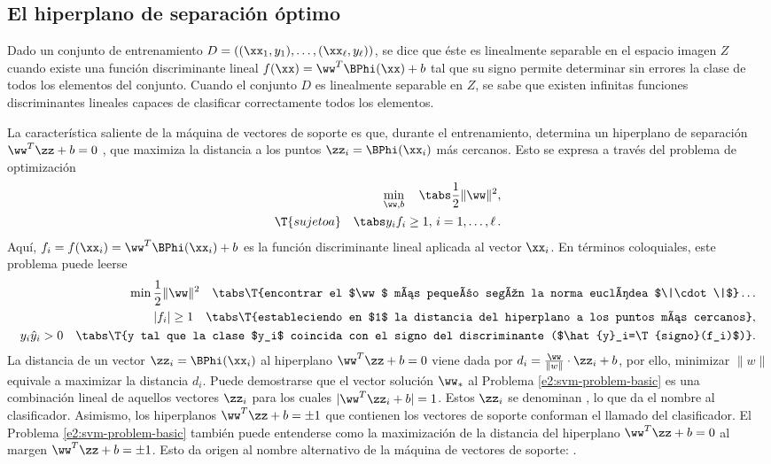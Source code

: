 %
%
\subsection{El hiperplano de separación óptimo}
%
Dado un conjunto de entrenamiento
$D=\left((\xx_1,y_1),\ldots,(\xx_\ell,y_\ell)\right)$, se dice que
éste es linealmente separable en el espacio imagen $Z$ cuando existe
una función discriminante lineal $f(\xx)=\ww^T\BPhi(\xx)+b$ tal que su
signo permite determinar sin errores la clase de todos los elementos
del conjunto. Cuando el conjunto $D$ es linealmente separable en $Z$,
se sabe que existen infinitas funciones discriminantes lineales
capaces de clasificar correctamente todos los elementos.

La característica saliente de la máquina de vectores de soporte es
que, durante el entrenamiento, determina un hiperplano de separación
$\ww^T\zz+b=0$ , que maximiza la distancia a los puntos
$\zz_i=\BPhi(\xx_i)$ más cercanos. Esto se expresa a través del
problema de optimización
%
\begin{equation}
  \begin{aligned}
    \min_{\ww,b} \quad\tabs \frac{1}{2}\|\ww\|^2, \\
    \T{sujeto a}\quad\tabs y_i f_i\geq1,\,i=1,\ldots,\ell\,.
  \end{aligned}
  \label{e2:svm-problem-basic}
\end{equation}
%
Aquí, $f_i=f(\xx_i)=\ww^T\BPhi(\xx_i)+b$ es la función discriminante
lineal aplicada al vector $\xx_i$. En términos coloquiales, este
problema puede leerse
%
\begin{align*}
  \min \frac{1}{2}\|\ww\|^2 \quad \tabs \T{encontrar el $\ww$ más
    pequeño según la norma euclídea $\|\cdot\|$}\ldots\\
  |f_i|\geq1 \quad \tabs \T{estableciendo en $1$ la distancia del
    hiperplano a los puntos más cercanos},\\
  y_i\hat{y}_i>0\quad \tabs \T{y tal que la clase $y_i$ coincida con el
    signo del discriminante ($\hat{y}_i=\T{signo}(f_i)$)}.
\end{align*}
%
La distancia de un vector $\zz_i=\BPhi(\xx_i)$ al hiperplano
$\ww^T\zz+b=0$ viene dada por $d_i=\frac{\ww}{\|w\|}\cdot\zz_i+b$, por
ello, minimizar $\|w\|$ equivale a maximizar la distancia $d_i$.
Puede demostrarse que el vector solución $\ww_*$ al Problema
\ref{e2:svm-problem-basic} es una combinación lineal de aquellos
vectores $\zz_i$ para los cuales $|\ww^T\zz_i+b|=1$. Estos $\zz_i$ se
denominan , lo que da el nombre al
clasificador.  Asimismo, los hiperplanos $\ww^T\zz+b=\pm1$ que
contienen los vectores de soporte conforman el llamado  del
clasificador. El Problema \ref{e2:svm-problem-basic} también puede
entenderse como la maximización de la distancia del hiperplano
$\ww^T\zz+b=0$ al margen $\ww^T\zz+b=\pm1$. Esto da origen al nombre
alternativo de la máquina de vectores de soporte: .

